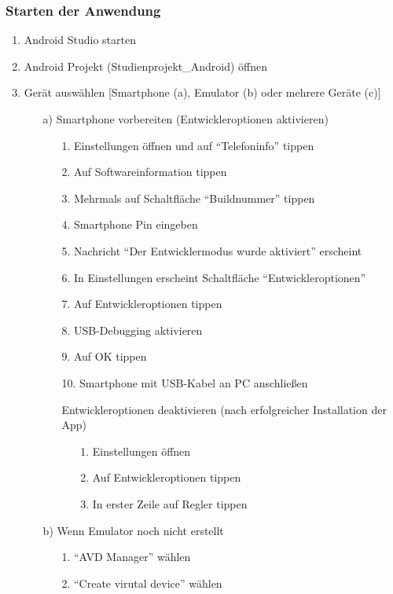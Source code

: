 \documentclass[12pt, onecolumn, notitlepage]{scrartcl}
\begin{document}
\subsubsection{Starten der Anwendung}
\begin{enumerate}
	\setlength\itemsep{0.07em}
	\item Android Studio starten
	\item Android Projekt (Studienprojekt\_Android) öffnen
	\item Gerät auswählen [Smartphone (a), Emulator (b) oder mehrere Geräte (c)]
	\begin{itemize}
		\item[a)] Smartphone vorbereiten (Entwickleroptionen aktivieren)
		\begin{enumerate}
			\item[1.] Einstellungen öffnen und auf \enquote{Telefoninfo} tippen
			\item[2.] Auf Softwareinformation tippen
			\item[3.] Mehrmals auf Schaltfläche \enquote{Buildnummer} tippen
			\item[4.] Smartphone Pin eingeben
			\item[5.] Nachricht \enquote{Der Entwicklermodus wurde aktiviert} erscheint
			\item[6.] In Einstellungen erscheint Schaltfläche \enquote{Entwickleroptionen}
			\item[7.] Auf Entwickleroptionen tippen
			\item[8.] USB-Debugging aktivieren
			\item[9.] Auf OK tippen
			\item[10.] Smartphone mit USB-Kabel an PC anschließen
			\item[] Entwickleroptionen deaktivieren (nach erfolgreicher Installation der App)
			\begin{itemize}
				\item[1.] Einstellungen öffnen
				\item[2.] Auf Entwickleroptionen tippen
				\item[3.] In erster Zeile auf Regler tippen
			\end{itemize}
		\end{enumerate}
		\item[b)] Wenn Emulator noch nicht erstellt
			\begin{itemize}
			\item[1.] \enquote{AVD Manager} wählen
			\item[2.] \enquote{Create virutal device} wählen

\end{itemize}
\end{itemize}
\end{enumerate}
\end{document}
